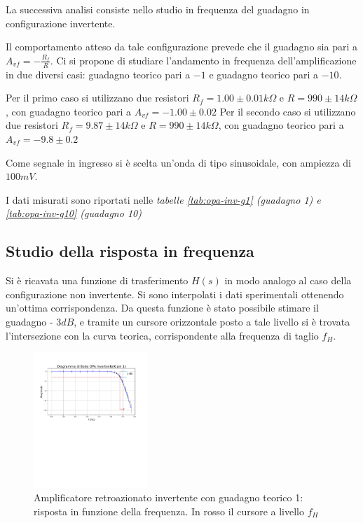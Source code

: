 \documentclass[journal]{IEEEtran}
\begin{document}
La successiva analisi consiste nello studio in frequenza del guadagno in configurazione invertente.

Il comportamento atteso da tale configurazione prevede che il guadagno sia pari a $A_{vf} = -\frac{R_f}{R}$. 
Ci si propone di studiare l'andamento in frequenza dell'amplificazione in due diversi casi: guadagno teorico pari a $-1$ e guadagno teorico pari a $-10$.

Per il primo caso si utilizzano due resistori $R_f = 1.00 \pm 0.01 k\Omega $ e $R = 990 \pm 14 k\Omega$, con guadagno teorico pari a $A_{vf} = -1.00 \pm 0.02 $ Per il secondo caso si utilizzano due resistori $R_f = 9.87 \pm 14 k\Omega $ e $R = 990 \pm 14 k\Omega$, con guadagno teorico pari a $A_{vf} = -9.8 \pm 0.2$

Come segnale in ingresso si è scelta un'onda di tipo sinusoidale, con ampiezza di $100 mV$.

I dati misurati sono riportati nelle \textit{tabelle \ref{tab:opa-inv-g1} (guadagno 1) e \ref{tab:opa-inv-g10} (guadagno 10)}

\subsection{\textbf{Studio della risposta in frequenza}}

Si è ricavata una funzione di trasferimento $H(s)$ in modo analogo al caso della configurazione non invertente. Si sono interpolati i dati sperimentali ottenendo un'ottima corrispondenza. Da questa funzione è stato possibile stimare il guadagno - $3 dB$, e tramite un cursore orizzontale posto a tale livello si è trovata l'intersezione con la curva teorica, corrispondente alla frequenza di taglio $f_H$.

\begin{figure}[H]%
\begin{center}
\includegraphics[width=0.38\textwidth]{analysis/output/OPA-bode_gain1(mag).pdf}
\caption{Amplificatore retroazionato invertente con guadagno teorico 1: risposta in funzione della frequenza. In rosso il cursore a livello $f_H$}
\label{fig:closed_loop_inv_gain_1}
\end{center}
\end{figure}
\end{document}
